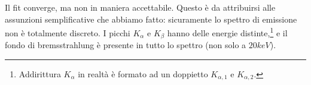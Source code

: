 Il fit converge, ma non in maniera accettabile.
Questo è da attribuirsi alle assunzioni semplificative che abbiamo fatto: sicuramente lo spettro di emissione non è totalmente discreto.
I picchi $ K_\alpha $ e $ K_\beta $ hanno delle energie distinte,\footnote{Addirittura $ K_\alpha $ in realtà è formato ad un doppietto $ K_{\alpha,1} $ e $ K_{\alpha,2} $.} e il fondo di bremsstrahlung è presente in tutto lo spettro (non solo a $ 20 \unit{keV} $). 
